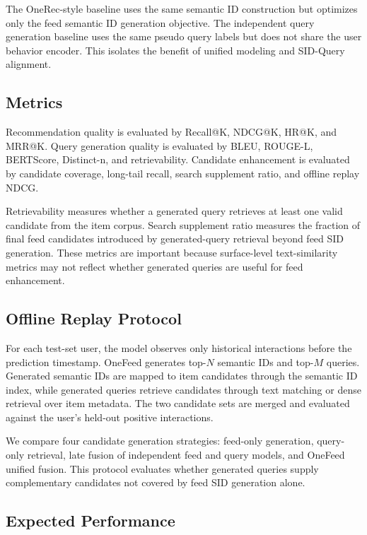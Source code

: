 \documentclass[11pt]{article}
\begin{document}
The OneRec-style baseline uses the same semantic ID construction but optimizes only the feed semantic ID generation objective. The independent query generation baseline uses the same pseudo query labels but does not share the user behavior encoder. This isolates the benefit of unified modeling and SID-Query alignment.

\subsection{Metrics}

Recommendation quality is evaluated by Recall@K, NDCG@K, HR@K, and MRR@K. Query generation quality is evaluated by BLEU, ROUGE-L, BERTScore, Distinct-n, and retrievability. Candidate enhancement is evaluated by candidate coverage, long-tail recall, search supplement ratio, and offline replay NDCG.

Retrievability measures whether a generated query retrieves at least one valid candidate from the item corpus. Search supplement ratio measures the fraction of final feed candidates introduced by generated-query retrieval beyond feed SID generation. These metrics are important because surface-level text-similarity metrics may not reflect whether generated queries are useful for feed enhancement.

\subsection{Offline Replay Protocol}

For each test-set user, the model observes only historical interactions before the prediction timestamp. OneFeed generates top-$N$ semantic IDs and top-$M$ queries. Generated semantic IDs are mapped to item candidates through the semantic ID index, while generated queries retrieve candidates through text matching or dense retrieval over item metadata. The two candidate sets are merged and evaluated against the user's held-out positive interactions.

We compare four candidate generation strategies: feed-only generation, query-only retrieval, late fusion of independent feed and query models, and OneFeed unified fusion. This protocol evaluates whether generated queries supply complementary candidates not covered by feed SID generation alone.

\subsection{Expected Performance}
\end{document}
